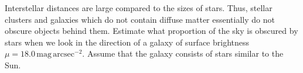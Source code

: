 Interstellar distances are large compared to the sizes of stars. Thus,
stellar clusters and galaxies which do not contain diffuse matter essentially
do not obscure objects behind them. Estimate what proportion of the sky is
obscured by stars when we look in the direction of a galaxy of surface
brightness $\mu = 18.0\,\mathrm{mag\,arcsec^{-2}}$. Assume that the galaxy
consists of stars similar to the Sun.
